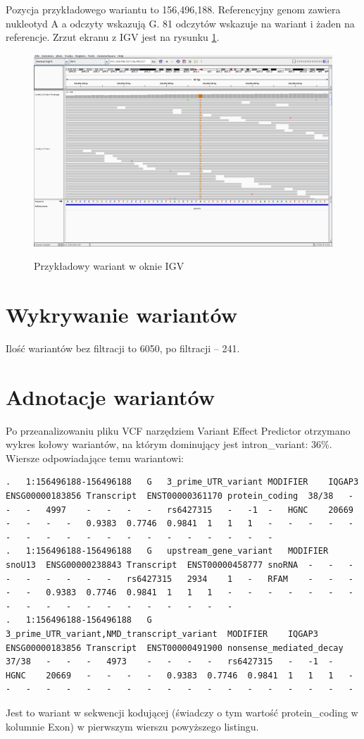 \documentclass[a4paper]{article}
\begin{document}
Pozycja przykładowego wariantu to 156,496,188.
Referencyjny genom zawiera nukleotyd A a odczyty wskazują G.
81 odczytów wskazuje na wariant i żaden na referencje.
Zrzut ekranu z IGV jest na rysunku \ref{fig:igv}.

\begin{figure}[h]
    \centering
    \includegraphics[width=1.0\textwidth]{sampleVariant.png}
    \label{fig:igv}
    \caption[]{Przykładowy wariant w oknie IGV}
\end{figure}


\section{Wykrywanie wariantów}  

Ilość wariantów bez filtracji to 6050, po filtracji -- 241.

\section{Adnotacje wariantów}  
Po przeanalizowaniu pliku VCF narzędziem Variant Effect Predictor otrzymano wykres kołowy wariantów, na którym dominujący jest intron\_variant: 36\%.
Wiersze odpowiadające temu wariantowi:
\begin{verbatim}
.	1:156496188-156496188	G	3_prime_UTR_variant	MODIFIER	IQGAP3	ENSG00000183856	Transcript	ENST00000361170	protein_coding	38/38	-	-	-	4997	-	-	-	-	rs6427315	-	-1	-	HGNC	20669	-	-	-	-	0.9383	0.7746	0.9841	1	1	1	-	-	-	-	-	-	-	-	-	-	-	-	-	-	-	-	-	-	-
.	1:156496188-156496188	G	upstream_gene_variant	MODIFIER	snoU13	ENSG00000238843	Transcript	ENST00000458777	snoRNA	-	-	-	-	-	-	-	-	-	rs6427315	2934	1	-	RFAM	-	-	-	-	-	0.9383	0.7746	0.9841	1	1	1	-	-	-	-	-	-	-	-	-	-	-	-	-	-	-	-	-	-	-
.	1:156496188-156496188	G	3_prime_UTR_variant,NMD_transcript_variant	MODIFIER	IQGAP3	ENSG00000183856	Transcript	ENST00000491900	nonsense_mediated_decay	37/38	-	-	-	4973	-	-	-	-	rs6427315	-	-1	-	HGNC	20669	-	-	-	-	0.9383	0.7746	0.9841	1	1	1	-	-	-	-	-	-	-	-	-	-	-	-	-	-	-	-	-	-	-
\end{verbatim}
Jest to wariant w sekwencji kodującej (świadczy o tym wartość protein\_coding w kolumnie Exon) w pierwszym wierszu powyższego listingu.
\end{document}
